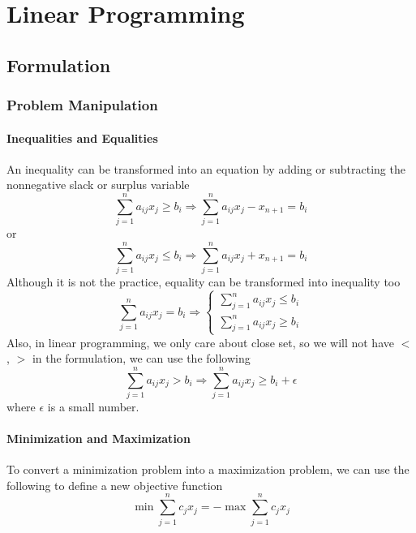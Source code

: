 \part{Linear Programming}
	\chapter{Formulation}
		\section{Problem Manipulation}
			\subsection{Inequalities and Equalities}
				An inequality can be transformed into an equation by adding or subtracting the nonnegative slack or surplus variable
				\begin{equation}
					\sum_{j=1}^na_{ij}x_j \ge b_i \Rightarrow \sum_{j=1}^na_{ij}x_j - x_{n+1} = b_i 
				\end{equation}
				or
				\begin{equation}
					\sum_{j=1}^na_{ij}x_j \le b_i \Rightarrow \sum_{j=1}^na_{ij}x_j + x_{n+1} = b_i 
				\end{equation}
				Although it is not the practice, equality can be transformed into inequality too
				\begin{equation}
					\sum_{j=1}^na_{ij}x_j = b_i \Rightarrow \begin{cases}\sum_{j=1}^na_{ij}x_j \le b_i \\ \sum_{j=1}^na_{ij}x_j \ge b_i \end{cases} 
				\end{equation}
				Also, in linear programming, we only care about close set, so we will not have $<$, $>$ in the formulation, we can use the following
				\begin{equation}
					\sum_{j=1}^na_{ij}x_j > b_i \Rightarrow \sum_{j=1}^na_{ij}x_j \ge b_i + \epsilon 
				\end{equation}
				where $\epsilon$ is a small number.
			
			\subsection{Minimization and Maximization}
				To convert a minimization problem into a maximization problem, we can use the following to define a new objective function
				\begin{equation}
					\min \sum_{j=1}^nc_jx_j = -\max \sum_{j=1}^n c_jx_j 
				\end{equation}
			
